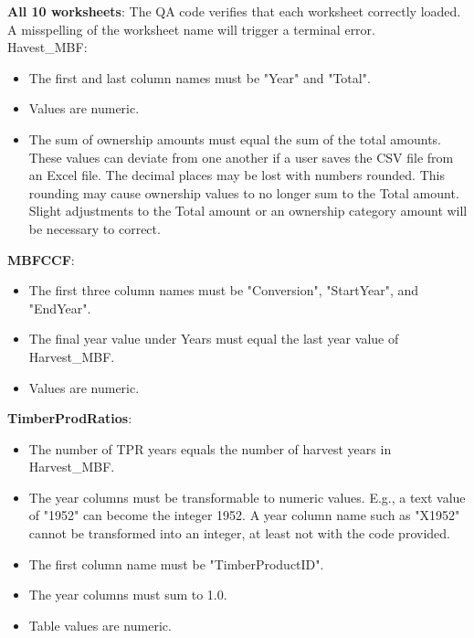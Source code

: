 \documentclass[
  openany]{book}
\providecommand{\tightlist}{%
  \setlength{\itemsep}{0pt}\setlength{\parskip}{0pt}}
\begin{document}
\textbf{All 10 worksheets}: The QA code verifies that each worksheet correctly loaded. A misspelling of the worksheet name will trigger a terminal error.\\
Havest\_MBF:

\begin{itemize}
\tightlist
\item
  The first and last column names must be "Year" and "Total".\\
\item
  Values are numeric.\\
\item
  The sum of ownership amounts must equal the sum of the total amounts. These values can deviate from one another if a user saves the CSV file from an Excel file. The decimal places may be lost with numbers rounded. This rounding may cause ownership values to no longer sum to the Total amount. Slight adjustments to the Total amount or an ownership category amount will be necessary to correct.
\end{itemize}

\textbf{MBFCCF}:

\begin{itemize}
\tightlist
\item
  The first three column names must be "Conversion", "StartYear", and "EndYear".\\
\item
  The final year value under Years must equal the last year value of Harvest\_MBF.\\
\item
  Values are numeric.
\end{itemize}

\textbf{TimberProdRatios}:

\begin{itemize}
\tightlist
\item
  The number of TPR years equals the number of harvest years in Harvest\_MBF.\\
\item
  The year columns must be transformable to numeric values. E.g., a text value of "1952" can become the integer 1952. A year column name such as "X1952" cannot be transformed into an integer, at least not with the code provided.\\
\item
  The first column name must be "TimberProductID".\\
\item
  The year columns must sum to 1.0.\\
\item
  Table values are numeric.
\end{itemize}
\end{document}
